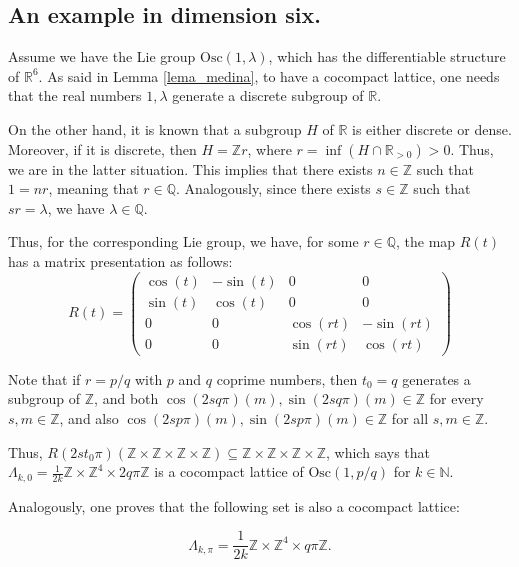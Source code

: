 \documentclass[12pt]{amsart}
\theoremstyle{plain}
\theoremstyle{definition}
\theoremstyle{remark}
\begin{document}
\subsection{An example in dimension six.}

Assume we have the Lie group \( \text{Osc}(1,\lambda) \), which has the differentiable structure of \( \mathbb{R}^6 \). As said in Lemma \ref{lema_medina}, to have a cocompact lattice, one needs that the real numbers \( 1,\lambda \) generate a discrete subgroup of \( \mathbb{R} \).

On the other hand, it is known that a subgroup \( H \) of \( \mathbb{R} \) is either discrete or dense. Moreover, if it is discrete, then \( H = \mathbb{Z}r \), where \( r = \inf(H \cap \mathbb{R}_{>0}) > 0 \). Thus, we are in the latter situation. This implies that there exists \( n \in \mathbb{Z} \) such that \( 1 = nr \), meaning that \( r \in \mathbb{Q} \). Analogously, since there exists \( s \in \mathbb{Z} \) such that \( sr = \lambda \), we have \( \lambda \in \mathbb{Q} \).

Thus, for the corresponding Lie group, we have, for some \( r \in \mathbb{Q} \), the map \( R(t) \) has a matrix presentation as follows:
\[
R(t) = \left( \begin{matrix} 
\cos(t) & -\sin(t) & 0 & 0 \\
\sin(t) & \cos(t) & 0 & 0 \\
0 & 0 & \cos(rt) & -\sin(rt) \\
0 & 0 & \sin(rt) & \cos(rt)
\end{matrix}
\right)
\]
 
Note that if \( r = p/q \) with \( p \) and \( q \) coprime numbers, then \( t_0 = q \) generates a subgroup of \( \mathbb{Z} \), and both \( \cos(2sq\pi)(m), \sin(2sq\pi)(m) \in \mathbb{Z} \) for every \( s, m \in \mathbb{Z} \), and also \( \cos(2sp\pi)(m), \sin(2sp\pi)(m) \in \mathbb{Z} \) for all \( s, m \in \mathbb{Z} \).

Thus, \( R(2st_0\pi)(\mathbb{Z} \times \mathbb{Z} \times \mathbb{Z} \times \mathbb{Z}) \subseteq \mathbb{Z} \times \mathbb{Z} \times \mathbb{Z} \times \mathbb{Z} \), which says that \( \Lambda_{k,0} = \frac{1}{2k} \mathbb{Z} \times \mathbb{Z}^4 \times 2q\pi\mathbb{Z} \) is a cocompact lattice of \( \text{Osc}(1,p/q) \) for \( k \in \mathbb{N} \).

Analogously, one proves that the following set is also a cocompact lattice:

\[
\Lambda_{k,\pi} = \frac{1}{2k} \mathbb{Z} \times \mathbb{Z}^4 \times q\pi\mathbb{Z}.
\]
\end{document}
